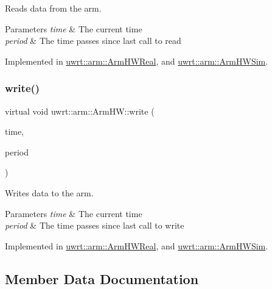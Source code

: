 Reads data from the arm. 


\begin{DoxyParams}{Parameters}
{\em time} & The current time \\
\hline
{\em period} & The time passes since last call to read \\
\hline
\end{DoxyParams}


Implemented in \hyperlink{classuwrt_1_1arm_1_1_arm_h_w_real_a7a4704f71c0652269a2e9c10907ca8b1}{uwrt\+::arm\+::\+Arm\+H\+W\+Real}, and \hyperlink{classuwrt_1_1arm_1_1_arm_h_w_sim_a78eb2303fba768155763a25797c0eecf}{uwrt\+::arm\+::\+Arm\+H\+W\+Sim}.

\mbox{\label{classuwrt_1_1arm_1_1_arm_h_w_a934119487836109e24d9054f10e9832f}} 
\subsubsection{\texorpdfstring{write()}{write()}}
{\footnotesize\ttfamily virtual void uwrt\+::arm\+::\+Arm\+H\+W\+::write (\begin{DoxyParamCaption}\item[{const ros\+::\+Time \&}]{time,  }\item[{const ros\+::\+Duration \&}]{period }\end{DoxyParamCaption})\hspace{0.3cm}{\ttfamily [pure virtual]}}



Writes data to the arm. 


\begin{DoxyParams}{Parameters}
{\em time} & The current time \\
\hline
{\em period} & The time passes since last call to write \\
\hline
\end{DoxyParams}


Implemented in \hyperlink{classuwrt_1_1arm_1_1_arm_h_w_real_a25ab702964a8b1db7ea58b040189b820}{uwrt\+::arm\+::\+Arm\+H\+W\+Real}, and \hyperlink{classuwrt_1_1arm_1_1_arm_h_w_sim_aa334fca03f76265ca8ec2da3be53991f}{uwrt\+::arm\+::\+Arm\+H\+W\+Sim}.



\subsection{Member Data Documentation}
\mbox{\label{classuwrt_1_1arm_1_1_arm_h_w_a47b8fb1ffec74c5699b3d32827b4f5b6}} 
